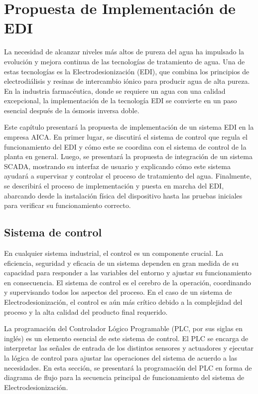 \chapter{Propuesta de Implementación de EDI}
\label{cap:propuesta_implementacion}

La necesidad de alcanzar niveles más altos de pureza del agua ha impulsado
la evolución y mejora continua de las tecnologías de tratamiento de agua.
Una de estas tecnologías es la Electrodesionización (EDI), que combina
los principios de electrodiálisis y resinas de intercambio iónico para
producir agua de alta pureza. En la industria farmacéutica, donde se
requiere un agua con una calidad excepcional, la implementación de la
tecnología EDI se convierte en un paso esencial después de la ósmosis inversa doble.

Este capítulo presentará la propuesta de implementación de un sistema
EDI en la empresa AICA. En primer lugar, se discutirá el sistema de
control que regula el funcionamiento del EDI y cómo este se coordina
con el sistema de control de la planta en general.
Luego, se presentará la propuesta de integración de un sistema SCADA,
mostrando su interfaz de usuario y explicando cómo este sistema
ayudará a supervisar y controlar el proceso de tratamiento del agua.
Finalmente, se describirá el proceso de implementación y puesta en marcha del
EDI, abarcando desde la instalación física del dispositivo hasta las pruebas
iniciales para verificar su funcionamiento correcto.

\section{Sistema de control}
\label{sec:sistema_control}

En cualquier sistema industrial, el control es un componente crucial. La eficiencia, seguridad y eficacia de un sistema dependen en gran medida de su capacidad para responder a las variables del entorno y ajustar su funcionamiento en consecuencia. El sistema de control es el cerebro de la operación, coordinando y supervisando todos los aspectos del proceso. En el caso de un sistema de Electrodesionización, el control es aún más crítico debido a la complejidad del proceso y la alta calidad del producto final requerido.

La programación del Controlador Lógico Programable (PLC, por sus siglas en inglés) es un elemento esencial de este sistema de control. El PLC se encarga de interpretar las señales de entrada de los distintos sensores y actuadores y ejecutar la lógica de control para ajustar las operaciones del sistema de acuerdo a las necesidades. En esta sección, se presentará la programación del PLC en forma de diagrama de flujo para la secuencia principal de funcionamiento del sistema de Electrodesionización.

